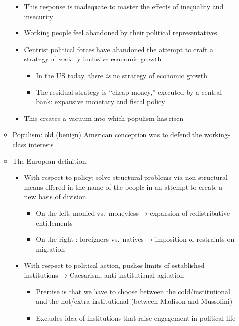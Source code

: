 \begin{itemize}
\begin{itemize}
    \begin{itemize}
    \tightlist
    \item
      This response is inadequate to master the effects of inequality
      and insecurity
    \item
      Working people feel abandoned by their political representatives
    \item
      Centrist political forces have abandoned the attempt to craft a
      strategy of socially inclusive economic growth

      \begin{itemize}
      \tightlist
      \item
        In the US today, there \emph{is} no strategy of economic growth
      \item
        The residual strategy is ``cheap money,'' executed by a central
        bank: expansive monetary and fiscal policy
      \end{itemize}
    \item
      This creates a vacuum into which populism has risen
    \end{itemize}
  \item
    Populism: old (benign) American conception was to defend the
    working-class interests
  \item
    The European definition:

    \begin{itemize}
    \tightlist
    \item
      With respect to policy: solve structural problems via
      non-structural means offered in the name of the people in an
      attempt to create a new basis of division

      \begin{itemize}
      \tightlist
      \item
        On the left: monied vs.~moneyless → expansion of redistributive
        entitlements
      \item
        On the right : foreigners vs.~natives → imposition of restraints
        on migration
      \end{itemize}
    \item
      With respect to political action, pushes limits of established
      institutions → Caesarism, anti-institutional agitation

      \begin{itemize}
      \tightlist
      \item
        Premise is that we have to choose between the cold/institutional
        and the hot/extra-institutional (between Madison and Mussolini)
      \item
        Excludes idea of institutions that raise engagement in political
        life
      \end{itemize}
    \end{itemize}
  \end{itemize}
\end{itemize}

